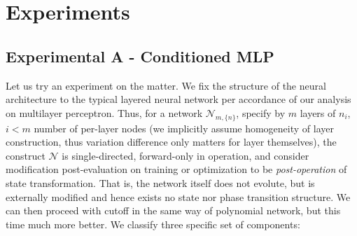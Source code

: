 \section{Experiments}

\subsection{Experimental A - Conditioned MLP}

Let us try an experiment on the matter. We fix the structure of the neural architecture to the typical layered neural network per accordance of our analysis on multilayer perceptron. Thus, for a network $\mathcal{N}_{m,\{n\}}$, specify by $m$ layers of $n_{i}$, $i<m$ number of per-layer nodes (we implicitly assume homogeneity of layer construction, thus variation difference only matters for layer themselves), the construct $\mathcal{N}$ is single-directed, forward-only in operation, and consider modification post-evaluation on training or optimization to be \textit{post-operation} of state transformation. That is, the network itself does not evolute, but is externally modified and hence exists no state nor phase transition structure. We can then proceed with cutoff in the same way of polynomial network, but this time much more better. We classify three specific set of components:
